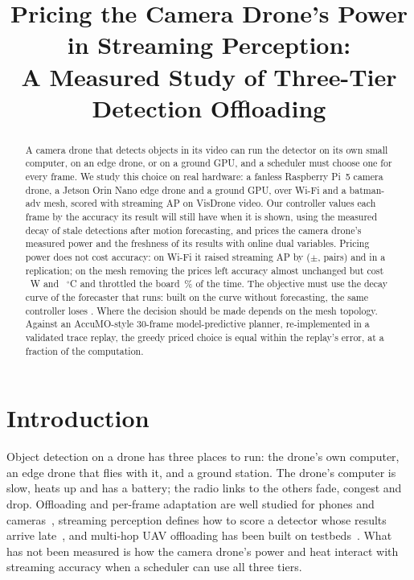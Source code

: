 \documentclass[conference]{IEEEtran}
\begin{document}
\title{Pricing the Camera Drone's Power in Streaming Perception:\\A Measured Study of Three-Tier Detection Offloading}
\author{
}
\maketitle

\begin{abstract}
A camera drone that detects objects in its video can run the detector on its own small computer, on an edge drone,
or on a ground GPU, and a scheduler must choose one for every frame. We study this choice on real hardware: a fanless
Raspberry Pi~5 camera drone, a Jetson Orin Nano edge drone and a ground GPU, over Wi-Fi and a batman-adv mesh, scored
with streaming AP on VisDrone video. Our controller values each frame by the accuracy its result will still have when
it is shown, using the measured decay of stale detections after motion forecasting, and prices the camera drone's
measured power and the freshness of its results with online dual variables. Pricing power does not cost accuracy: on
Wi-Fi it raised streaming AP by \EnGain{} ($\pm$\EnGainCi{}, \EnPairs{} pairs) and \EnRepGain{} in a replication; on
the mesh removing the prices left accuracy almost unchanged but cost \MeshNoPriceW{}~W and \MeshNoPriceC{}~$^\circ$C
and throttled the board \MeshNoPriceThrottle{}\,\% of the time. The objective must use the decay curve of the forecaster
that runs: built on the curve without forecasting, the same controller loses \MainNoFc{}. Where the decision should be
made depends on the mesh topology. Against an AccuMO-style 30-frame model-predictive planner, re-implemented in a
validated trace replay, the greedy priced choice is equal within the replay's error, at a fraction of the computation.
\end{abstract}

\section{Introduction}
Object detection on a drone has three places to run: the drone's own computer, an edge drone that flies with it, and a
ground station. The drone's computer is slow, heats up and has a battery; the radio links to the others fade, congest
and drop. Offloading and per-frame adaptation are well studied for phones and cameras~\cite{Ra_2011,Chen_2015,Zhang_2021},
streaming perception defines how to score a detector whose results arrive late~\cite{Li_2020,Yang_2022}, and multi-hop
UAV offloading has been built on testbeds~\cite{Coletta_2023}. What has not been measured is how the camera drone's
power and heat interact with streaming accuracy when a scheduler can use all three tiers.
\end{document}
